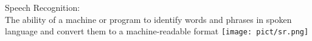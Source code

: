 \documentclass[aspectratio=169]{beamer}
\begin{document}

\begin{frame}[t, fragile]
\LARGE{Speech Recognition}:\\
\small{The ability of a machine or program to identify words and phrases in spoken language and convert them to a machine-readable format}
\texttt{[image: pict/sr.png]}
\end{frame}
\end{document}
